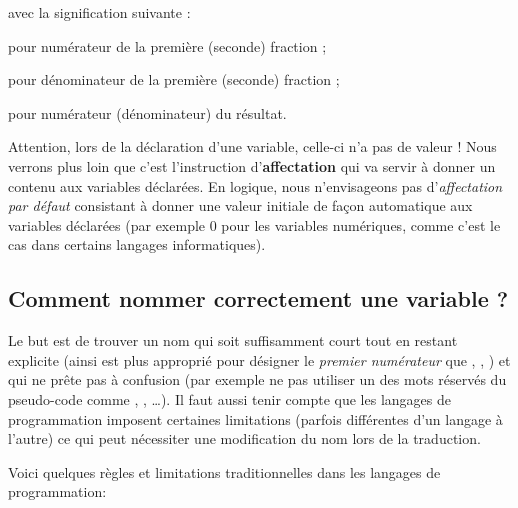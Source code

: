 			avec la signification suivante :

			\begin{liste}
			\item
				 pour numérateur 
				de la première (seconde) fraction ;
			\item
				 pour dénominateur 
				de la première (seconde) fraction ;
			\item
				pour numérateur (dénominateur) du résultat.
			\end{liste}
			
			Attention, lors de la déclaration d’une variable, celle-ci n’a pas de
			valeur ! Nous verrons plus loin que c’est l’instruction
			d’\textbf{affectation} qui va servir à donner un contenu aux variables
			déclarées. En logique, nous n’envisageons pas d’\textit{affectation par
			défaut} consistant à donner une valeur initiale de façon automatique
			aux variables déclarées (par exemple 0 pour les variables numériques,
			comme c’est le cas dans certains langages informatiques).

		\subsection{Comment nommer correctement une variable ?}

			Le but est de trouver un nom qui soit suffisamment court tout en restant
			explicite (ainsi  est plus approprié pour
			désigner le \textit{premier numérateur }que ,
			, ) et qui ne prête pas à confusion (par exemple ne pas
			utiliser un des mots réservés du pseudo-code comme
			, ,
			…). Il faut aussi tenir compte que les
			langages de programmation imposent certaines limitations (parfois
			différentes d'un langage à l'autre)
			ce qui peut nécessiter une modification du nom lors de la traduction.

			Voici quelques règles et limitations traditionnelles dans les langages
			de programmation:

